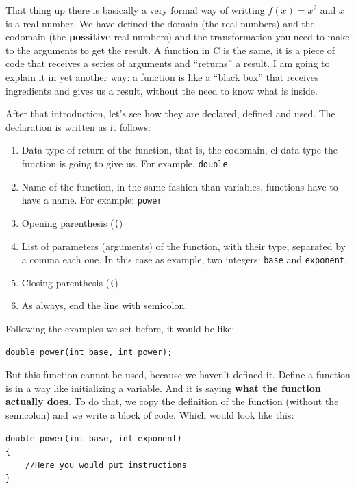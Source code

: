 \documentclass[a4paper]{article}
\begin{document}
That thing up there is basically a very formal way of writting $f(x) = x^2$
and $x$ is a real number. We have defined the domain (the real numbers) and the
codomain (the \textbf{possitive} real numbers) and the transformation you need
to make to the arguments to get the result. A function in C is the same, it is
a piece of code that receives a series of arguments and ``returns'' a result.
I am going to explain it in yet another way: a function is like a ``black box''
that receives ingredients and gives us a result, without the need to know what
is inside.

After that introduction, let's see how they are declared, defined and used.
The declaration is written as it follows:
\begin{enumerate}
\item Data type of return of the function, that is, the codomain, el data type
the function is going to give us. For example, \lstinline[style=C]{double}.
\item Name of the function, in the same fashion than variables, functions have
to have a name. For example: \verb!power!
\item Opening parenthesis (\texttt{(})
\item List of parameters (arguments) of the function, with their type, separated
by a comma each one. In this case as example, two integers: \verb!base! and
\verb!exponent!.
\item Closing parenthesis (\texttt{(})
\item As always, end the line with semicolon.
\end{enumerate}

Following the examples we set before, it would be like:

\noindent
\begin{minipage}[H]{\linewidth}
\mbox{}
\begin{lstlisting}[style=C, label={lst:functionDeclaration},
caption={Function declaration in C}]
double power(int base, int power);
\end{lstlisting}
\end{minipage}

But this function cannot be used, because we haven't defined it. Define a
function is in a way like initializing a variable. And it is saying
\textbf{what the function actually does}. To do that, we copy the definition of
the function (without the semicolon) and we write a block of code. Which would
look like this:

\noindent
\begin{minipage}[H]{\linewidth}
\mbox{}
\begin{lstlisting}[style=C, label={lst:functionDefinition},
caption={Definition of a function in C}]
double power(int base, int exponent)
{
    //Here you would put instructions
}
\end{lstlisting}
\end{minipage}
\end{document}
